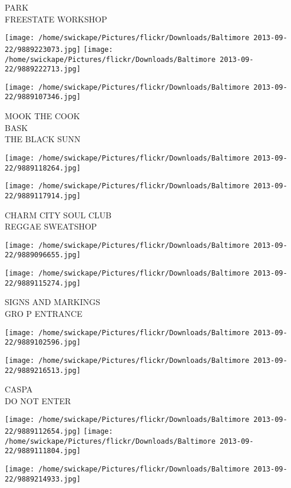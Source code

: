 \documentclass[10pt,letterpaper]{article}
\begin{document}
PARK\\
FREESTATE WORKSHOP
\pagebreak

\texttt{[image: /home/swickape/Pictures/flickr/Downloads/Baltimore 2013-09-22/9889223073.jpg]}
\texttt{[image: /home/swickape/Pictures/flickr/Downloads/Baltimore 2013-09-22/9889222713.jpg]}

\texttt{[image: /home/swickape/Pictures/flickr/Downloads/Baltimore 2013-09-22/9889107346.jpg]}

MOOK THE COOK\\
BASK\\
THE BLACK SUNN
\pagebreak

\texttt{[image: /home/swickape/Pictures/flickr/Downloads/Baltimore 2013-09-22/9889118264.jpg]}

\vspace{0.25in}
\texttt{[image: /home/swickape/Pictures/flickr/Downloads/Baltimore 2013-09-22/9889117914.jpg]}

CHARM CITY SOUL CLUB\\
REGGAE SWEATSHOP
\pagebreak

\texttt{[image: /home/swickape/Pictures/flickr/Downloads/Baltimore 2013-09-22/9889096655.jpg]}

\vspace{0.25in}
\texttt{[image: /home/swickape/Pictures/flickr/Downloads/Baltimore 2013-09-22/9889115274.jpg]}

SIGNS AND MARKINGS\\
GRO P ENTRANCE
\pagebreak

\texttt{[image: /home/swickape/Pictures/flickr/Downloads/Baltimore 2013-09-22/9889102596.jpg]}

\vspace{0.25in}
\texttt{[image: /home/swickape/Pictures/flickr/Downloads/Baltimore 2013-09-22/9889216513.jpg]}

CASPA\\
DO NOT ENTER
\pagebreak

\texttt{[image: /home/swickape/Pictures/flickr/Downloads/Baltimore 2013-09-22/9889112654.jpg]}
\texttt{[image: /home/swickape/Pictures/flickr/Downloads/Baltimore 2013-09-22/9889111804.jpg]}

\vspace{0.25in}
\texttt{[image: /home/swickape/Pictures/flickr/Downloads/Baltimore 2013-09-22/9889214933.jpg]}
\end{document}
